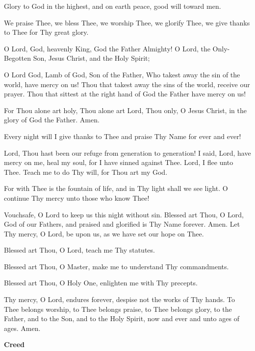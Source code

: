 \begin{hang}
\noindent{}Glory to God in the highest, and on earth peace, good will toward men.

We praise Thee, we bless Thee, we worship Thee, we glorify Thee, we give thanks to Thee for Thy great glory.

O Lord, God, heavenly King, God the Father Almighty! O Lord, the Only-Begotten Son, Jesus Christ, and the Holy Spirit;

O Lord God, Lamb of God, Son of the Father, Who takest away the sin of the world, have mercy on us!  Thou that takest away the sins of the world, receive our prayer.  Thou that sittest at the right hand of God the Father have mercy on us!

For Thou alone art holy, Thou alone art Lord, Thou only, O Jesus Christ, in the glory of God the Father.  Amen.

Every night will I give thanks to Thee and praise Thy Name for ever and ever!

Lord, Thou hast been our refuge from generation to generation!  I said, Lord, have mercy on me, heal my soul, for I have sinned against Thee.  Lord, I flee unto Thee.  Teach me to do Thy will, for Thou art my God.

For with Thee is the fountain of life, and in Thy light shall we see light.  O continue Thy mercy unto those who know Thee!

Vouchsafe, O Lord to keep us this night without sin.  Blessed art Thou, O Lord, God of our Fathers, and praised and glorified is Thy Name forever.  Amen.  Let Thy mercy, O Lord, be upon us, as we have set our hope on Thee.

Blessed art Thou, O Lord, teach me Thy statutes.

Blessed art Thou, O Master, make me to understand Thy commandments.

Blessed art Thou, O Holy One, enlighten me with Thy precepts.

Thy mercy, O Lord, endures forever, despise not the works of Thy hands. To Thee belongs worship, to Thee belongs praise, to Thee belongs glory, to the Father, and to the Son, and to the Holy Spirit, now and ever and unto ages of ages. 
Amen.

\end{hang}


\begin{center}
\textbf{Creed}
\end{center}



